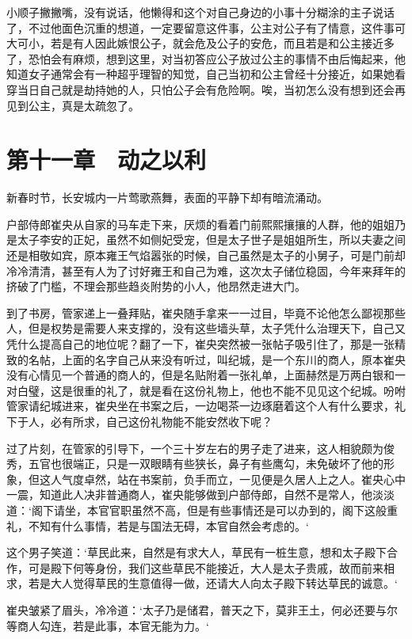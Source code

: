小顺子撇撇嘴，没有说话，他懒得和这个对自己身边的小事十分糊涂的主子说话了，不过他面色沉重的想道，一定要留意这件事，公主对公子有了情意，这件事可大可小，若是有人因此嫉恨公子，就会危及公子的安危，而且若是和公主接近多了，恐怕会有麻烦，想到这里，对当初答应公子放过公主的事情不由后悔起来，他知道女子通常会有一种超乎理智的知觉，自己当初和公主曾经十分接近，如果她看穿当日自己就是劫持她的人，只怕公子会有危险啊。唉，当初怎么没有想到还会再见到公主，真是太疏忽了。

\chapter{第十一章　动之以利}

新春时节，长安城内一片莺歌燕舞，表面的平静下却有暗流涌动。

户部侍郎崔央从自家的马车走下来，厌烦的看着门前熙熙攘攘的人群，他的姐姐乃是太子李安的正妃，虽然不如侧妃受宠，但是太子世子是姐姐所生，所以夫妻之间还是相敬如宾，原本雍王气焰嚣张的时候，自己虽然是太子的小舅子，可是门前却冷冷清清，甚至有人为了讨好雍王和自己为难，这次太子储位稳固，今年来拜年的挤破了门槛，不理会那些趋炎附势的小人，他昂然走进大门。

到了书房，管家递上一叠拜贴，崔央随手拿来一一过目，毕竟不论他怎么鄙视那些人，但是权势是需要人来支撑的，没有这些墙头草，太子凭什么治理天下，自己又凭什么提高自己的地位呢？翻了一下，崔央突然被一张帖子吸引住了，那是一张精致的名帖，上面的名字自己从来没有听过，叫纪城，是一个东川的商人，原本崔央没有心情见一个普通的商人的，但是名贴附着一张礼单，上面赫然是万两白银和一对白璧，这是很重的礼了，就是看在这份礼物上，他也不能不见见这个纪城。吩咐管家请纪城进来，崔央坐在书案之后，一边喝茶一边琢磨着这个人有什么要求，礼下于人，必有所求，自己这份礼物能不能安然收下呢？

过了片刻，在管家的引导下，一个三十岁左右的男子走了进来，这人相貌颇为俊秀，五官也很端正，只是一双眼睛有些狭长，鼻子有些鹰勾，未免破坏了他的形象，但这人气度卓然，站在书案前，负手而立，一见便是久居人上之人。崔央心中一震，知道此人决非普通商人，崔央能够做到户部侍郎，自然不是常人，他淡淡道：‘阁下请坐，本官官职虽然不高，但是有些事情还是可以办到的，阁下这般重礼，不知有什么事情，若是与国法无碍，本官自然会考虑的。‘

这个男子笑道：‘草民此来，自然是有求大人，草民有一桩生意，想和太子殿下合作，可是殿下何等身份，我们这些草民不能接近，大人是太子贵戚，故而前来相求，若是大人觉得草民的生意值得一做，还请大人向太子殿下转达草民的诚意。‘

崔央皱紧了眉头，冷冷道：‘太子乃是储君，普天之下，莫非王土，何必还要与尔等商人勾连，若是此事，本官无能为力。‘

